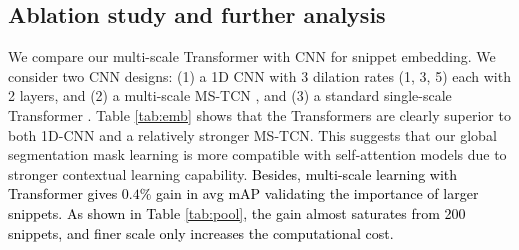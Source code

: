 \documentclass[runningheads]{llncs}
\begin{document}
\subsection{Ablation study and further analysis}
\label{sec:ablation}
We compare our multi-scale Transformer with CNN for snippet embedding.
We consider two CNN designs:
(1) a 1D CNN
with 3 dilation rates 
(1, 3, 5) each with 2 layers,
 and 
(2) a multi-scale MS-TCN \cite{farha2019ms}, 
and (3) a standard single-scale Transformer \cite{vaswani2017attention}.
Table \ref{tab:emb} shows that 
the Transformers are clearly superior to both 1D-CNN and a relatively stronger MS-TCN. This suggests that our global segmentation mask learning is more compatible with self-attention models due to stronger contextual learning capability.
\noindent \textcolor{black}{Besides, multi-scale learning with Transformer gives $0.4\%$ gain in avg mAP validating the importance of larger snippets. As shown in Table \ref{tab:pool}, the gain almost saturates from 200 snippets,
and finer scale only increases the computational cost.}
\end{document}
